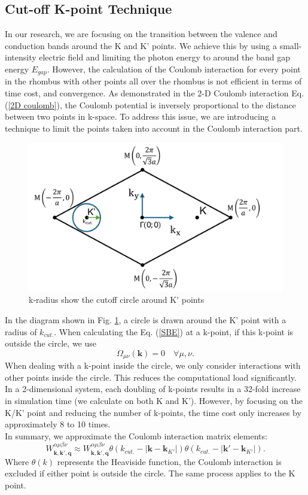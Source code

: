 \documentclass[12pt,english,a4paper]{article}
\begin{document}
\subsection{Cut-off K-point Technique}
\quad In our research, we are focusing on the transition between the valence and conduction bands around the K and K' points. We achieve this by using a small-intensity electric field and limiting the photon energy to around the band gap energy $E_{gap}$. However, the calculation of the Coulomb interaction for every point in the rhombus with other points all over the rhombus is not efficient in terms of time cost, and convergence. As demonstrated in the 2-D Coulomb interaction Eq. (\ref{2D coulomb}), the Coulomb potential is inversely proportional to the distance between two points in k-space. To address this issue, we are introducing a technique to limit the points taken into account in the Coulomb interaction part.\\\null
\begin{figure}[ht]
	\begin{center}
		\includegraphics[width = 0.5 \linewidth]{Images/kcutoff.pdf}
		\caption{k-radius show the cutoff circle around K' points}
		\label{k cutoff}
	\end{center}
\end{figure}
\quad In the diagram shown in Fig. \ref{k cutoff}, a circle is drawn around the K' point with a radius of $k_{cut.}$. When calculating the Eq. (\ref{SBE}) at a k-point, if this k-point is outside the circle, we use
$$\Omega_{\mu \nu}(\textbf{k}) = 0 \quad \forall \mu,\nu.$$
\quad When dealing with a k-point inside the circle, we only consider interactions with other points inside the circle. This reduces the computational load significantly. In a 2-dimensional system, each doubling of k-points results in a 32-fold increase in simulation time (we calculate on both K and K'). However, by focusing on the K/K' point and reducing the number of k-points, the time cost only increases by approximately 8 to 10 times.\\\null
\quad In summary, we approximate the Coulomb interaction matrix elements:
$$W^{\alpha \mu \beta \nu}_{\textbf{k},\textbf{k}',\textbf{q}} \approx W^{\alpha \mu \beta \nu}_{\textbf{k},\textbf{k}',\textbf{q}} \theta(k_{cut.} - |\textbf{k} - \textbf{k}_{K'}|) \theta(k_{cut.} - |\textbf{k}' - \textbf{k}_{K'}|).$$
\quad Where $\theta(k)$ represents the Heaviside function, the Coulomb interaction is excluded if either point is outside the circle. The same process applies to the K point.
\end{document}
